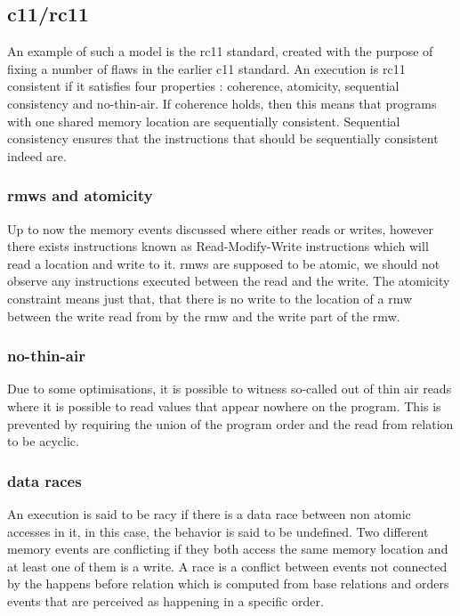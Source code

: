 \documentclass[a4,12pt]{article}
\begin{document}
\subsection{c11/rc11}

An example of such a model is the rc11 standard, created with the purpose of fixing a number of flaws in the earlier c11 standard. An execution is rc11 consistent if it satisfies four properties : coherence, atomicity, sequential consistency and no-thin-air. If coherence holds, then this means that programs with one shared memory location are sequentially consistent. Sequential consistency ensures that the instructions that should be sequentially consistent indeed are.

\subsubsection{rmws and atomicity}

Up to now the memory events discussed where either reads or writes, however there exists instructions known as Read-Modify-Write instructions which will read a location and write to it. rmws are supposed to be atomic, we should not observe any instructions executed between the read and the write. The atomicity constraint means just that, that there is no write to the location of a rmw between the write read from by the rmw and the write part of the rmw.

\subsubsection{no-thin-air}

Due to some optimisations, it is possible to witness so-called out of thin air reads where it is possible to read values that appear nowhere on the program. This is prevented by requiring the union of the program order and the read from relation to be acyclic.

\subsubsection{data races}

An execution is said to be racy if there is a data race between non atomic accesses in it, in this case, the behavior is said to be undefined. Two different memory events are conflicting if they both access the same memory location and at least one of them is a write. A race is a conflict between events not connected by the happens before relation which is computed from base relations and orders events that are perceived as happening in a specific order.
\end{document}
